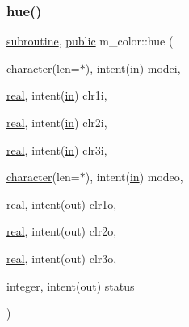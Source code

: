 \subsubsection{\texorpdfstring{hue()}{hue()}}
{\footnotesize\ttfamily \hyperlink{M__stopwatch_83_8txt_acfbcff50169d691ff02d4a123ed70482}{subroutine}, \hyperlink{M__stopwatch_83_8txt_a2f74811300c361e53b430611a7d1769f}{public} m\+\_\+color\+::hue (\begin{DoxyParamCaption}\item[{\hyperlink{option__stopwatch_83_8txt_abd4b21fbbd175834027b5224bfe97e66}{character}(len=$\ast$), intent(\hyperlink{M__journal_83_8txt_afce72651d1eed785a2132bee863b2f38}{in})}]{modei,  }\item[{\hyperlink{read__watch_83_8txt_abdb62bde002f38ef75f810d3a905a823}{real}, intent(\hyperlink{M__journal_83_8txt_afce72651d1eed785a2132bee863b2f38}{in})}]{clr1i,  }\item[{\hyperlink{read__watch_83_8txt_abdb62bde002f38ef75f810d3a905a823}{real}, intent(\hyperlink{M__journal_83_8txt_afce72651d1eed785a2132bee863b2f38}{in})}]{clr2i,  }\item[{\hyperlink{read__watch_83_8txt_abdb62bde002f38ef75f810d3a905a823}{real}, intent(\hyperlink{M__journal_83_8txt_afce72651d1eed785a2132bee863b2f38}{in})}]{clr3i,  }\item[{\hyperlink{option__stopwatch_83_8txt_abd4b21fbbd175834027b5224bfe97e66}{character}(len=$\ast$), intent(\hyperlink{M__journal_83_8txt_afce72651d1eed785a2132bee863b2f38}{in})}]{modeo,  }\item[{\hyperlink{read__watch_83_8txt_abdb62bde002f38ef75f810d3a905a823}{real}, intent(out)}]{clr1o,  }\item[{\hyperlink{read__watch_83_8txt_abdb62bde002f38ef75f810d3a905a823}{real}, intent(out)}]{clr2o,  }\item[{\hyperlink{read__watch_83_8txt_abdb62bde002f38ef75f810d3a905a823}{real}, intent(out)}]{clr3o,  }\item[{integer, intent(out)}]{status }\end{DoxyParamCaption})}


